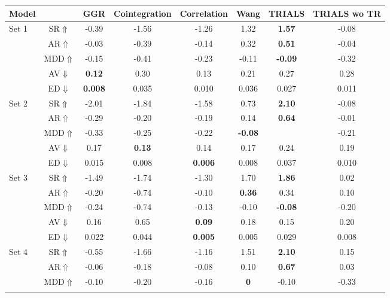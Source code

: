 \documentclass[sigconf]{acmart}
\begin{document}
\begin{table*}[htp]
\centering
\small
\begin{tabular}{@{}l||c|c|c|c|c||c|c|@{}}
\toprule
Model &  & GGR & Cointegration & Correlation & Wang & TRIALS & TRIALS wo TR\\ \midrule
\multirow{5}{*}{Set 1} & SR$\Uparrow$ & -0.39 & -1.56 & -1.26 & 1.32 & \textbf{1.57} & -0.08  \\ \cmidrule{2-8}
& AR$\Uparrow$ & -0.03 & -0.39 & -0.14 & 0.32 & \textbf{0.51} & -0.04  \\\cmidrule{2-8}
& MDD$\Uparrow$ & -0.15 & -0.41 & -0.23 & -0.11 & \textbf{-0.09} & -0.32  \\\cmidrule{2-8}
 & AV$\Downarrow$ & \textbf{0.12} & 0.30 & 0.13 & 0.21 & 0.27 & 0.28  \\\cmidrule{2-8}
& ED$\Downarrow$ & \textbf{0.008} & 0.035 & 0.010 & 0.036 & 0.027 & 0.011  \\ \midrule \midrule
\multirow{5}{*}{Set 2} & SR$\Uparrow$ & -2.01 & -1.84 &-1.58 & 0.73 & \textbf{2.10} & -0.08 \\\cmidrule{2-8}
 & AR$\Uparrow$ & -0.29 & -0.20 & -0.19 & 0.14 & \textbf{0.64} & -0.01\\\cmidrule{2-8}
 & MDD$\Uparrow$ & -0.33 & -0.25 & -0.22 & \textbf{-0.08} & \-0.11 & -0.21  \\\cmidrule{2-8}
 & AV$\Downarrow$ & 0.17 & \textbf{0.13} & 0.14 & 0.17 & 0.24 & 0.19 \\\cmidrule{2-8}
 & ED$\Downarrow$ & 0.015 & 0.008 & \textbf{0.006} & 0.008 & 0.037 & 0.010 \\\midrule \midrule
\multirow{5}{*}{Set 3} & SR$\Uparrow$ & -1.49 & -1.74 & -1.30 & 1.70 & \textbf{1.86} & 0.02  \\\cmidrule{2-8}
 & AR$\Uparrow$ & -0.20 & -0.74 & -0.10 & \textbf{0.36} & 0.34 & 0.10  \\\cmidrule{2-8}
 & MDD$\Uparrow$ & -0.24 & -0.74 & -0.13 & -0.10 & \textbf{-0.08} & -0.20 \\\cmidrule{2-8}
 & AV$\Downarrow$ & 0.16 & 0.65 & \textbf{0.09} & 0.18 & 0.15 & 0.20  \\\cmidrule{2-8}
 & ED$\Downarrow$ & 0.022 & 0.044 & \textbf{0.005} & 0.005 & 0.029 & 0.008 \\\midrule \midrule
\multirow{5}{*}{Set 4} & SR$\Uparrow$ & -0.55 & -1.66 & -1.16 & 1.51 & \textbf{2.10} & 0.15 \\\cmidrule{2-8}
 & AR$\Uparrow$ & -0.06 & -0.18 & -0.08 & 0.10 & \textbf{0.67} & 0.03 \\\cmidrule{2-8}
 & MDD$\Uparrow$ & -0.10 & -0.20 & -0.16 & \textbf{0} & -0.10 & -0.33 \\\cmidrule{2-8}

\end{tabular}
\end{table*}
\end{document}
